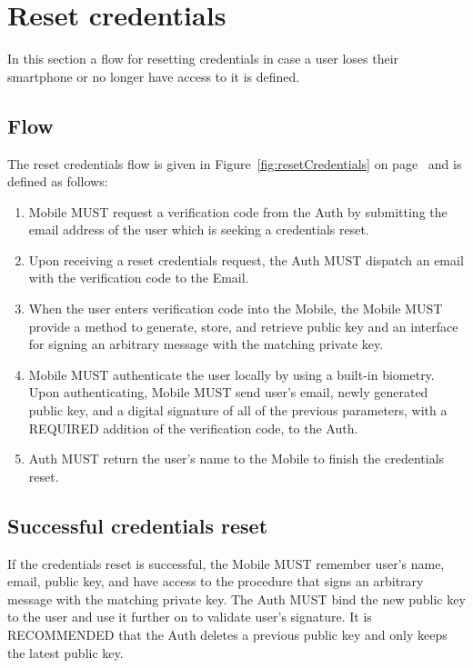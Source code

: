 \section{Reset credentials}
In this section a flow for resetting credentials in case a user loses their smartphone or no longer have access to it 
is defined.

    \subsection{Flow}
    The reset credentials flow is given in Figure~\ref{fig:resetCredentials} on page~\pageref{fig:resetCredentials} 
    and is defined as follows:
        \begin{enumerate}
            \item Mobile MUST request a verification code from the Auth by submitting the email address of the user
                  which is seeking a credentials reset.
            \item Upon receiving a reset credentials request, the Auth MUST dispatch an email with the verification
                  code to the Email.
            \item When the user enters verification code into the Mobile, the Mobile MUST provide a method to generate,
                  store, and retrieve public key and an interface for signing an arbitrary message with the matching 
                  private key.
            \item Mobile MUST authenticate the user locally by using a built-in biometry. Upon authenticating, Mobile 
                  MUST send user's email, newly generated public key, and a digital signature of all of the previous 
                  parameters, with a REQUIRED addition of the verification code, to the Auth.
            \item Auth MUST return the user's name to the Mobile to finish the credentials reset.
        \end{enumerate}
        

    \subsection{Successful credentials reset}
    If the credentials reset is successful, the Mobile MUST remember user's name, email, public key, and 
    have access to the procedure that signs an arbitrary message with the matching private key. The Auth MUST 
    bind the new public key to the user and use it further on to validate user's signature. It is RECOMMENDED that
    the Auth deletes a previous public key and only keeps the latest public key.


